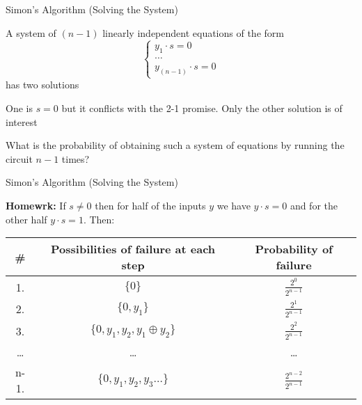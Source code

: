 \documentclass{beamer}
\begin{document}
\begin{frame}{Simon's Algorithm (Solving the System)}

        A system of $(n-1)$ \alert{linearly independent} equations of the form
        \[
                \begin{cases}
                        y_1 \cdot s = 0 \\
                        \dots \\
                        y_{(n-1)} \cdot s = 0
                \end{cases}
        \]
        has two solutions 

        One is $s = 0$ but it conflicts with the 2-1 promise. Only
        the other solution is of interest

        \pause
        What is the probability of obtaining such a system of equations
        by running the circuit $n-1$ times?
\end{frame}

\begin{frame}{Simon's Algorithm (Solving the System)}

        \textbf{Homewrk:} If $s \not = 0$ then for half of the inputs $y$ we
        have $y \cdot s = 0$ and for the other half $y \cdot s = 1$. Then:

        \begin{tabular}{|c | c | c| }
                \hline 
                \# & Possibilities of failure at each step &  Probability of failure 
                \\
                \hline
                1. & $\{0\}$ & $\frac{2^0}{2^{n-1}}$ \\
                \hline 
                2. & $\{0,y_1\}$ & $\frac{2^1}{2^{n-1}}$ \\
                \hline 
                3. & $\{0,y_1,y_2,y_1 \oplus y_2\}$ & $\frac{2^2}{2^{n-1}}$  \\
                \hline
                \dots & \dots & \dots \\
                \hline
                n-1. &  $\{0,y_1,y_2, y_3 \dots \}$ &  $\frac{2^{n-2}}{2^{n-1}}$ \\
                \hline
        \end{tabular}
\end{frame}
\end{document}
